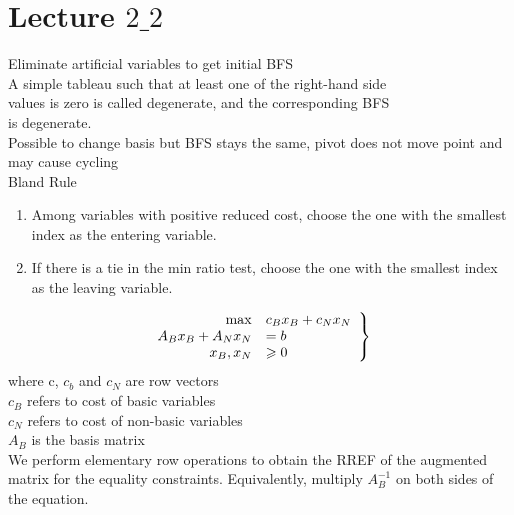 \documentclass{article}
\begin{document}
\section{Lecture $2\_2$}
Eliminate artificial variables to get initial BFS\\
A simple tableau such that at least one of the right-hand side\\
values is zero is called degenerate, and the corresponding BFS\\
is degenerate.\\
Possible to change basis but BFS stays the same, pivot does not move point and may cause cycling\\
Bland Rule\\
\begin{enumerate}
  \item  Among variables with positive reduced cost, choose the one with the smallest index as the entering variable.
  \item If there is a tie in the min ratio test, choose the one with the smallest index as the leaving variable.
\end{enumerate}
$$
\left.\begin{array} { r l } { \max } & { c _ { B } x _ { B } + c _ { N } x _ { N } } \\ { A _ { B } x _ { B } + A _ { N } x _ { N } } & { = b } \\ { x _ { B } , x _ { N } } & { \geqslant 0 } \end{array} \right\}
$$
where c, $c_b$ and $c_N$ are row vectors\\
$c_B$ refers to cost of basic variables\\
$c_N$ refers to cost of non-basic variables\\
$A_B$ is the basis matrix\\

We perform elementary row operations to obtain the
RREF of the augmented matrix for the equality constraints.
Equivalently, multiply $A_B^{-1}$ on both sides of the equation.
\end{document}
